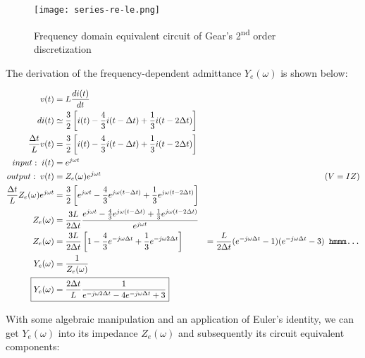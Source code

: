 \documentclass[10pt, oneside, letterpaper]{article}
\begin{document}
\begin{figure}[H]
  \centering
  \texttt{[image: series-re-le.png]}
  \caption{Frequency domain equivalent circuit of Gear's 2\textsuperscript{nd} order discretization}
  \label{gear-circuit}
\end{figure}

The derivation of the frequency-dependent admittance $Y_e{}(\omega{})$ is shown below:

\begin{alignat}{2}
v(t) &= L\frac{di(t)}{dt} \\
di(t) &\simeq \frac{3}{2}\left[i(t) - \frac{4}{3}i(t-\Delta{}t) + \frac{1}{3}i(t-2\Delta{}t)\right] \\
\frac{\Delta{}t}{L}v(t) &= \frac{3}{2}\left[i(t) - \frac{4}{3}i(t-\Delta{}t) + \frac{1}{3}i(t-2\Delta{}t)\right] \\
input:\;i(t) &= e^{j\omega{}t} \\
output:\;v(t) &= Z_e{}(\omega)e^{j\omega{}t} & (V = IZ) \\
\frac{\Delta{}t}{L}Z_e(\omega{})e^{j\omega{}t} &= \frac{3}{2}\left[e^{j\omega{}t} - \frac{4}{3}e^{j\omega{}(t-\Delta{}t)} + \frac{1}{3}e^{j\omega{}(t-2\Delta{}t)}\right] \\
Z_e(\omega{}) &= \frac{3L}{2\Delta{}t}\frac{e^{j\omega{}t} - \frac{4}{3}e^{j\omega{}(t-\Delta{}t)} + \frac{1}{3}e^{j\omega{}(t-2\Delta{}t)}}{e^{j\omega{}t}} \\
Z_e(\omega{}) &= \frac{3L}{2\Delta{}t}\left[1 - \frac{4}{3}e^{-j\omega{}\Delta{}t} + \frac{1}{3}e^{-j\omega{}2\Delta{}t}\right] &= \frac{L}{2\Delta{}t}(e^{-j\omega{}\Delta{}t} - 1)(e^{-j\omega{}\Delta{}t} - 3) \texttt{ hmmm...} \\
Y_e(\omega{}) &= \frac{1}{Z_e(\omega{})} \\
\Aboxed{Y_e(\omega{}) &= \frac{2\Delta{}t}{L}\frac{1}{e^{-j\omega{}2\Delta{}t} - 4e^{-j\omega{}\Delta{}t} + 3}}
\end{alignat}

With some algebraic manipulation and an application of Euler's identity, we can get $Y_e{}(\omega)$ into its impedance $Z_e{}(\omega)$ and subsequently its circuit equivalent components:
\end{document}
